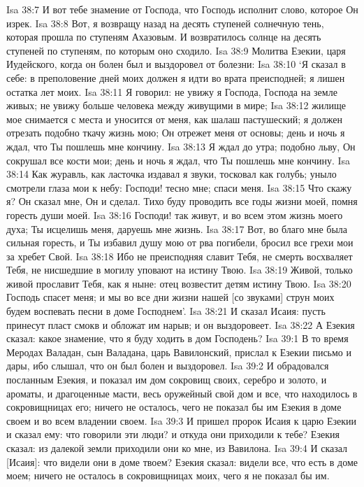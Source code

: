 Isa 38:7  И вот тебе знамение от Господа, что Господь исполнит слово, которое Он изрек.
Isa 38:8  Вот, я возвращу назад на десять ступеней солнечную тень, которая прошла по ступеням Ахазовым. И возвратилось солнце на десять ступеней по ступеням, по которым оно сходило.
Isa 38:9  Молитва Езекии, царя Иудейского, когда он болен был и выздоровел от болезни:
Isa 38:10  `Я сказал в себе: в преполовение дней моих должен я идти во врата преисподней; я лишен остатка лет моих.
Isa 38:11  Я говорил: не увижу я Господа, Господа на земле живых; не увижу больше человека между живущими в мире;
Isa 38:12  жилище мое снимается с места и уносится от меня, как шалаш пастушеский; я должен отрезать подобно ткачу жизнь мою; Он отрежет меня от основы; день и ночь я ждал, что Ты пошлешь мне кончину.
Isa 38:13  Я ждал до утра; подобно льву, Он сокрушал все кости мои; день и ночь я ждал, что Ты пошлешь мне кончину.
Isa 38:14  Как журавль, как ласточка издавал я звуки, тосковал как голубь; уныло смотрели глаза мои к небу: Господи! тесно мне; спаси меня.
Isa 38:15  Что скажу я? Он сказал мне, Он и сделал. Тихо буду проводить все годы жизни моей, помня горесть души моей.
Isa 38:16  Господи! так живут, и во всем этом жизнь моего духа; Ты исцелишь меня, даруешь мне жизнь.
Isa 38:17  Вот, во благо мне была сильная горесть, и Ты избавил душу мою от рва погибели, бросил все грехи мои за хребет Свой.
Isa 38:18  Ибо не преисподняя славит Тебя, не смерть восхваляет Тебя, не нисшедшие в могилу уповают на истину Твою.
Isa 38:19  Живой, только живой прославит Тебя, как я ныне: отец возвестит детям истину Твою.
Isa 38:20  Господь спасет меня; и мы во все дни жизни нашей [со звуками] струн моих будем воспевать песни в доме Господнем'.
Isa 38:21  И сказал Исаия: пусть принесут пласт смокв и обложат им нарыв; и он выздоровеет.
Isa 38:22  А Езекия сказал: какое знамение, что я буду ходить в дом Господень?
Isa 39:1  В то время Меродах Валадан, сын Валадана, царь Вавилонский, прислал к Езекии письмо и дары, ибо слышал, что он был болен и выздоровел.
Isa 39:2  И обрадовался посланным Езекия, и показал им дом сокровищ своих, серебро и золото, и ароматы, и драгоценные масти, весь оружейный свой дом и все, что находилось в сокровищницах его; ничего не осталось, чего не показал бы им Езекия в доме своем и во всем владении своем.
Isa 39:3  И пришел пророк Исаия к царю Езекии и сказал ему: что говорили эти люди? и откуда они приходили к тебе? Езекия сказал: из далекой земли приходили они ко мне, из Вавилона.
Isa 39:4  И сказал [Исаия]: что видели они в доме твоем? Езекия сказал: видели все, что есть в доме моем; ничего не осталось в сокровищницах моих, чего я не показал бы им.
